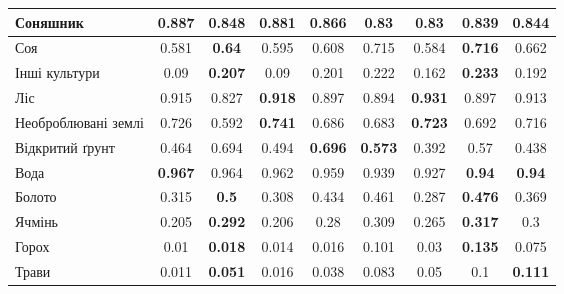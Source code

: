 \begin{table}[!ht]
\begin{tabular}{|K|C|C|C|C|C|C|C|C|}
        \hline Соняшник                & \textbf{0.887}                  & 0.848                           & 0.881          & 0.866          & 0.83           & 0.83           & 0.839          & \textbf{0.844} \\
        \hline Соя                     & 0.581                           & \textbf{0.64}                   & 0.595          & 0.608          & 0.715          & 0.584          & \textbf{0.716} & 0.662          \\
        \hline Інші культури           & 0.09                            & \textbf{0.207}                  & 0.09           & 0.201          & 0.222          & 0.162          & \textbf{0.233} & 0.192          \\
        \hline Ліс                     & 0.915                           & 0.827                           & \textbf{0.918} & 0.897          & 0.894          & \textbf{0.931} & 0.897          & 0.913          \\
        \hline Необроблювані землі     & 0.726                           & 0.592                           & \textbf{0.741} & 0.686          & 0.683          & \textbf{0.723} & 0.692          & 0.716          \\
        \hline Відкритий ґрунт         & 0.464                           & 0.694                           & 0.494          & \textbf{0.696} & \textbf{0.573} & 0.392          & 0.57           & 0.438          \\
        \hline Вода                    & \textbf{0.967}                  & 0.964                           & 0.962          & 0.959          & 0.939          & 0.927          & \textbf{0.94}  & \textbf{0.94}  \\
        \hline Болото                  & 0.315                           & \textbf{0.5}                    & 0.308          & 0.434          & 0.461          & 0.287          & \textbf{0.476} & 0.369          \\
        \hline Ячмінь                  & 0.205                           & \textbf{0.292}                  & 0.206          & 0.28           & 0.309          & 0.265          & \textbf{0.317} & 0.3            \\
        \hline Горох                   & 0.01                            & \textbf{0.018}                  & 0.014          & 0.016          & 0.101          & 0.03           & \textbf{0.135} & 0.075          \\
        \hline Трави                   & 0.011                           & \textbf{0.051}                  & 0.016          & 0.038          & 0.083          & 0.05           & 0.1            & \textbf{0.111} \\

\end{tabular}
\end{table}
